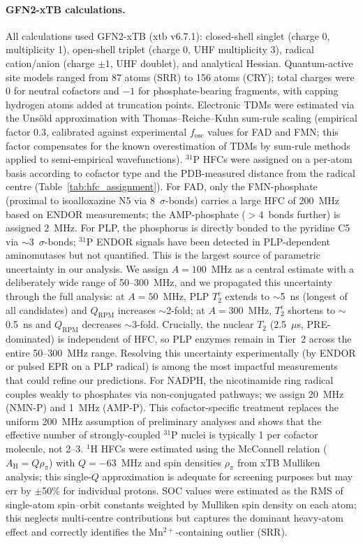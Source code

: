 \documentclass[11pt]{article}
\begin{document}
\paragraph{GFN2-xTB calculations.}
All calculations used GFN2-xTB (xtb v6.7.1)\cite{Bannwarth2019}: closed-shell singlet (charge 0, multiplicity 1), open-shell triplet (charge 0, UHF multiplicity 3), radical cation/anion (charge $\pm 1$, UHF doublet), and analytical Hessian. Quantum-active site models ranged from 87 atoms (SRR) to 156 atoms (CRY); total charges were 0 for neutral cofactors and $-1$ for phosphate-bearing fragments, with capping hydrogen atoms added at truncation points. Electronic TDMs were estimated via the Uns\"{o}ld approximation with Thomas--Reiche--Kuhn sum-rule scaling (empirical factor 0.3, calibrated against experimental $f_\mathrm{osc}$ values for FAD and FMN\cite{Islam2003}; this factor compensates for the known overestimation of TDMs by sum-rule methods applied to semi-empirical wavefunctions). $^{31}$P HFCs were assigned on a per-atom basis according to cofactor type and the PDB-measured distance from the radical centre (Table~\ref{tab:hfc_assignment}). For FAD, only the FMN-phosphate (proximal to isoalloxazine N5 via 8~$\sigma$-bonds) carries a large HFC of 200~MHz based on ENDOR measurements\cite{Weber1998}; the AMP-phosphate ($>$4~bonds further) is assigned 2~MHz. For PLP, the phosphorus is directly bonded to the pyridine C5 via $\sim$3~$\sigma$-bonds; $^{31}$P ENDOR signals have been detected in PLP-dependent aminomutases but not quantified. This is the largest source of parametric uncertainty in our analysis. We assign $A = 100$~MHz as a central estimate with a deliberately wide range of 50--300~MHz, and we propagated this uncertainty through the full analysis: at $A = 50$~MHz, PLP $T_2^e$ extends to $\sim$5~ns (longest of all candidates) and $Q_\mathrm{RPM}$ increases $\sim$2-fold; at $A = 300$~MHz, $T_2^e$ shortens to $\sim$0.5~ns and $Q_\mathrm{RPM}$ decreases $\sim$3-fold. Crucially, the nuclear $T_2$ (2.5~$\mu$s, PRE-dominated) is independent of HFC, so PLP enzymes remain in Tier~2 across the entire 50--300~MHz range. Resolving this uncertainty experimentally (by ENDOR or pulsed EPR on a PLP radical) is among the most impactful measurements that could refine our predictions. For NADPH, the nicotinamide ring radical couples weakly to phosphates via non-conjugated pathways; we assign 20~MHz (NMN-P) and 1~MHz (AMP-P). This cofactor-specific treatment replaces the uniform 200~MHz assumption of preliminary analyses and shows that the effective number of strongly-coupled $^{31}$P nuclei is typically 1 per cofactor molecule, not 2--3. $^1$H HFCs were estimated using the McConnell relation ($A_\mathrm{H} = Q\rho_\pi$) with $Q = -63$~MHz and spin densities $\rho_\pi$ from xTB Mulliken analysis; this single-$Q$ approximation is adequate for screening purposes but may err by $\pm$50\% for individual protons. SOC values were estimated as the RMS of single-atom spin--orbit constants weighted by Mulliken spin density on each atom\cite{Marian2012}; this neglects multi-centre contributions but captures the dominant heavy-atom effect and correctly identifies the Mn$^{2+}$-containing outlier (SRR).
\end{document}
